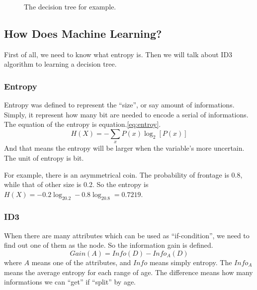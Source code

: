 \documentclass{article}
\begin{document}
\begin{figure}
  \centering
  \caption{The decision tree for example.}
  \label{fig:dt:eg}
\end{figure}

\subsection{How Does Machine Learning?}
\label{sec:dt:how}

First of all, we need to know what entropy is.
Then we will talk about ID3 algorithm to learning a decision tree.

\subsubsection{Entropy}
\label{sec:dt:how:entropy}

Entropy was defined to represent the ``size'', or say amount of informations.
Simply, it represent how many bit are needed to encode a serial of informations.
The equation of the entropy is equation.\ref{eq:entroy}.
\begin{equation}
  \label{eq:entropy}
  H(X) = - \sum\limits_x P(x)\log_2\left[P(x)\right]
\end{equation}
And that means the entropy will be larger when the variable's more uncertain.
The unit of entropy is bit.

For example, there is an asymmetrical coin. The probability of frontage is 0.8,
while that of other size is 0.2.
So the entropy is $H(X) = - 0.2\log_20.2 - 0.8\log_20.8 = 0.7219$.

\subsubsection{ID3}
\label{sec:dt:how:id3}

When there are many attributes which can be used as ``if-condition'',
we need to find out one of them as the node. So the information gain is defined.
\begin{equation}
  \label{eq:inforgain}
  Gain(A) = Info(D) - Info_A(D)
\end{equation}
where $A$ means one of the attributes, and $Info$ means simply entropy.
The $Info_A$ means the average entropy for each range of age.
The difference means how many informations we can ``get'' if ``split'' by age.
\end{document}
